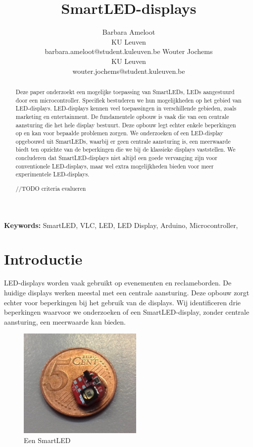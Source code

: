 \documentclass{article}
\title{SmartLED-displays}
\author{Barbara Ameloot\\
KU Leuven\\
barbara.ameloot@student.kuleuven.be
\And 
Wouter Jochems\\
KU Leuven\\
wouter.jochems@student.kuleuven.be}
\begin{document}
\fontsize{11pt}{13pt}\selectfont
\maketitle

\begin{abstract}
Deze paper onderzoekt een mogelijke toepassing van SmartLEDs, LEDs aangestuurd door een microcontroller\cite{smartLED}. Specifiek bestuderen we hun mogelijkheden op het gebied van LED-displays. LED-displays kennen veel toepassingen in verschillende gebieden, zoals marketing en entertainment. De fundamentele opbouw is vaak die van een centrale aansturing die het hele display bestuurt. Deze opbouw legt echter enkele beperkingen op en kan voor bepaalde problemen zorgen. We onderzoeken of een LED-display opgebouwd uit SmartLEDs, waarbij er geen centrale aansturing is, een meerwaarde biedt ten opzichte van de beperkingen die we bij de klassieke displays vaststellen. We concluderen dat SmartLED-displays niet altijd een goede vervanging zijn voor conventionele LED-displays, maar wel extra mogelijkheden bieden voor meer experimentele LED-displays.

//TODO criteria evalueren
\end{abstract}

{\bf Keywords:} SmartLED, VLC, LED, LED Display, Arduino, Microcontroller,


\section{Introductie}

LED-displays worden vaak gebruikt op evenementen en reclameborden. De huidige displays werken meestal met een centrale aansturing. Deze opbouw zorgt echter voor beperkingen bij het gebruik van de displays. Wij identificeren drie beperkingen waarvoor we onderzoeken of een SmartLED-display, zonder centrale aansturing, een meerwaarde kan bieden.

\begin{figure}
\centering
\includegraphics[width=6cm]{SmartLED.png}
\caption{Een SmartLED}
\end{figure}
\end{document}
